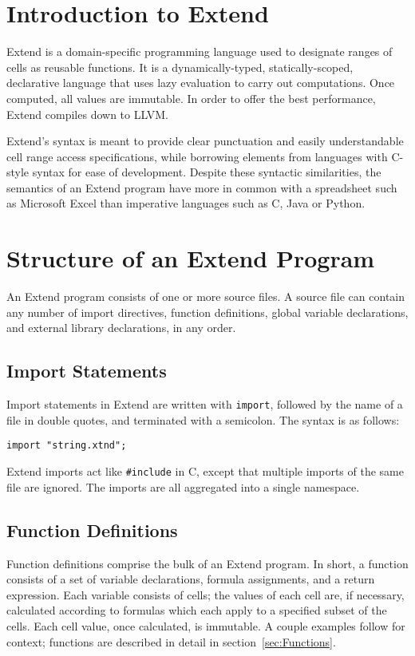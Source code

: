 \section{Introduction to Extend}
	Extend is a domain-specific programming language used to designate ranges of cells as reusable functions. It is a dynamically-typed, statically-scoped, declarative language that uses lazy evaluation to carry out computations. Once computed, all values are immutable. In order to offer the best performance, Extend compiles down to LLVM.

	Extend's syntax is meant to provide clear punctuation and easily understandable cell range access specifications, while borrowing elements from languages with C-style syntax for ease of development. Despite these syntactic similarities, the semantics of an Extend program have more in common with a spreadsheet such as Microsoft Excel than imperative languages such as C, Java or Python.

\section{Structure of an Extend Program}
\label{sec:Grammar}
	An Extend program consists of one or more source files. A source file can contain any number of import directives, function definitions, global variable declarations, and external library declarations, in any order.
	\subsection{Import Statements}
		Import statements in Extend are written with \texttt{import}, followed by the name of a file in double quotes, and terminated with a semicolon. The syntax is as follows:
		\begin{lstlisting}
import "string.xtnd";
		\end{lstlisting}
		Extend imports act like \texttt{\#include} in C, except that multiple imports of the same file are ignored. The imports are all aggregated into a single namespace.
		\subsection{Function Definitions}
			Function definitions comprise the bulk of an Extend program. In short, a function consists of a set of variable declarations, formula assignments, and a return expression. Each variable consists of cells; the values of each cell are, if necessary, calculated according to formulas which each apply to a specified subset of the cells. Each cell value, once calculated, is immutable. A couple examples follow for context; functions are described in detail in section~\ref{sec:Functions}.
			
